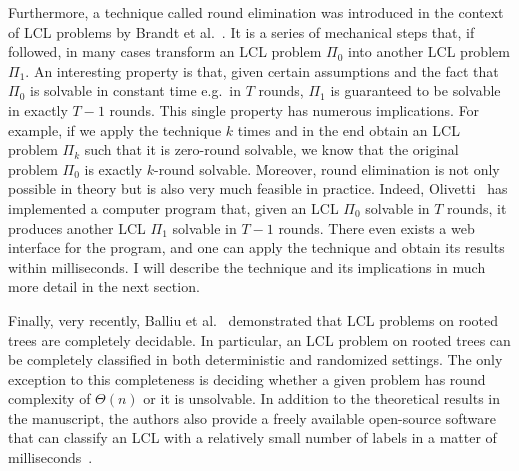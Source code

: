 Furthermore, a technique called round elimination was introduced in the context
of LCL problems by Brandt et al.~\cite{Brandt2019}. It is a series of mechanical
steps that, if followed, in many cases transform an LCL problem $\Pi_0$ into another LCL problem $\Pi_1$. An interesting property is that, given certain assumptions and the fact that
$\Pi_0$ is solvable in constant time e.g.\ in $T$ rounds, $\Pi_1$ is guaranteed to be
solvable in exactly $T - 1$ rounds. This single property has numerous implications.
For example, if we apply the technique $k$ times and in the end obtain an LCL problem $\Pi_k$
such that it is zero-round solvable, we know that the original problem $\Pi_0$ is
exactly $k$-round solvable. Moreover, round elimination is not only possible
in theory but is also very much feasible in practice.
Indeed, Olivetti~\cite{Olivetti2020} has
implemented a computer program that, given an LCL $\Pi_0$ solvable in $T$ rounds,
it produces another LCL $\Pi_1$ solvable in $T - 1$ rounds. There even exists
a web interface for the program, and one can apply the technique and obtain
its results within milliseconds. I will describe the technique and its implications
in much more detail in the next section.

Finally, very recently, Balliu et al.~\cite{Balliu2021} demonstrated
that LCL problems on rooted trees are completely decidable.
In particular, an LCL problem on rooted trees can be completely
classified in both deterministic and randomized settings. The only
exception to this completeness is deciding whether a given problem
has round complexity of $\Theta(n)$ or it is unsolvable. In addition
to the theoretical results in the manuscript, the authors also
provide a freely available open-source software that can
classify an LCL with a relatively small number of labels in a matter
of milliseconds~\cite{Studeny2021}.
